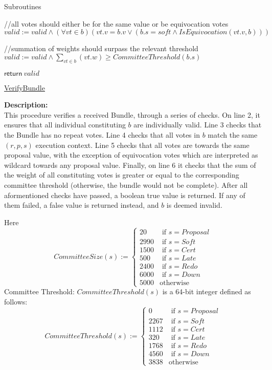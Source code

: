 \documentclass[10pt,a4paper]{article}
\begin{document}
\begin{section}{Subroutines}
\begin{algorithm}[H]
\begin{algorithmic}[1]
    //all votes should either be for the same value or be equivocation votes
    \State $valid := valid \land (\forall vt \in b)(vt.v = b.v \lor (b.s = soft \land IsEquivocation(vt.v, b)))$

    //summation of weights should surpass the relevant threshold
    \State $valid := valid \land  \sum_{vt \in b}(vt.w) \geq CommitteeThreshold(b.s)$

    \State $\mathsf{return} \ valid$

    \EndFunction
    \end{algorithmic}
    \caption{\underline{VerifyBundle}}
\end{algorithm}

\noindent \textbf{Description:}\\
This procedure verifies a received Bundle, through a series 
of checks.
On line 2, it ensures that all individual constituting $b$
are individually valid.
Line 3 checks that the Bundle has no repeat votes.
Line 4 checks that all votes in $b$ match the same $(r,p,s)$
execution context.
Line 5 checks that all votes are towards the same proposal value,
with the exception of equivocation votes which are interpreted as wildcard
towards any proposal value.
Finally, on line 6 it checks that the sum of the weight of all constituting
votes is greater or equal to the corresponding committee threshold (otherwise, 
the bundle would not be complete).
After all aformentioned checks have passed, a boolean true value is returned.
If any of them failed, a false value is returned instead, and $b$ is deemed invalid.

Here
$$
CommitteeSize(s):= \left\{
\begin{array}{rl}
     20 & \text{ if }s = Proposal \\
   2990 & \text{ if }s = Soft \\
   1500 & \text{ if }s = Cert \\
    500 & \text{ if }s = Late \\
   2400 & \text{ if }s = Redo \\
   6000 & \text{ if }s = Down \\
   5000 & \text{otherwise}
\end{array}
\right.
$$
Committee Threshold: $CommitteeThreshold(s)$ is a 64-bit integer defined as follows:
$$
CommitteeThreshold(s):= \left\{
\begin{array}{rl}
     0 &  \text{ if }s = Proposal \\
  2267 &  \text{ if }s = Soft \\
  1112 &  \text{ if }s = Cert \\
   320 &  \text{ if }s = Late \\
  1768 &  \text{ if }s = Redo \\
  4560 &  \text{ if }s = Down \\
  3838 &  \text{otherwise}
\end{array}
\right.
$$


\end{section}
\end{document}
